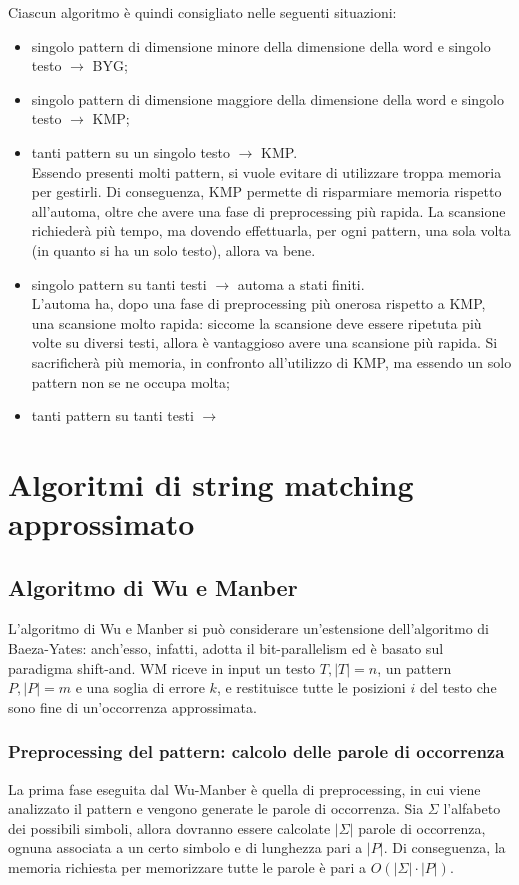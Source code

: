 Ciascun algoritmo è quindi consigliato nelle seguenti situazioni:
\begin{itemize}
    \item singolo pattern di dimensione minore della dimensione della word e singolo testo $\longrightarrow$ BYG;
    \item singolo pattern di dimensione maggiore della dimensione della word e singolo testo $\longrightarrow$ KMP;
    \item tanti pattern su un singolo testo $\longrightarrow$ KMP.\\
    Essendo presenti molti pattern, si vuole evitare di utilizzare troppa memoria per gestirli. Di conseguenza, KMP permette di risparmiare memoria rispetto all'automa, oltre che avere una fase di preprocessing più rapida. La scansione richiederà più tempo, ma dovendo effettuarla, per ogni pattern, una sola volta (in quanto si ha un solo testo), allora va bene.
    \item singolo pattern su tanti testi $\longrightarrow$ automa a stati finiti.\\
    L'automa ha, dopo una fase di preprocessing più onerosa rispetto a KMP, una scansione molto rapida: siccome la scansione deve essere ripetuta più volte su diversi testi, allora è vantaggioso avere una scansione più rapida. Si sacrificherà più memoria, in confronto all'utilizzo di KMP, ma essendo un solo pattern non se ne occupa molta;
    \item tanti pattern su tanti testi $\longrightarrow$
\end{itemize}

\section{Algoritmi di string matching approssimato}
\subsection*{Algoritmo di Wu e Manber}
L'algoritmo di Wu e Manber si può considerare un'estensione dell'algoritmo di Baeza-Yates: anch'esso, infatti, adotta il bit-parallelism ed è basato sul paradigma shift-and.
WM riceve in input un testo $T, |T| = n$, un pattern $P, |P|=m$ e una soglia di errore $k$, e restituisce tutte le posizioni $i$ del testo che sono fine di un'occorrenza approssimata.

\subsubsection{Preprocessing del pattern: calcolo delle parole di occorrenza}
La prima fase eseguita dal Wu-Manber è quella di preprocessing, in cui viene analizzato il pattern e vengono generate le parole di occorrenza. Sia $\Sigma$ l'alfabeto dei possibili simboli, allora dovranno essere calcolate $|\Sigma|$ parole di occorrenza, ognuna associata a un certo simbolo e di lunghezza pari a $|P|$.
Di conseguenza, la memoria richiesta per memorizzare tutte le parole è pari a $O(|\Sigma| \cdot |P|)$.

